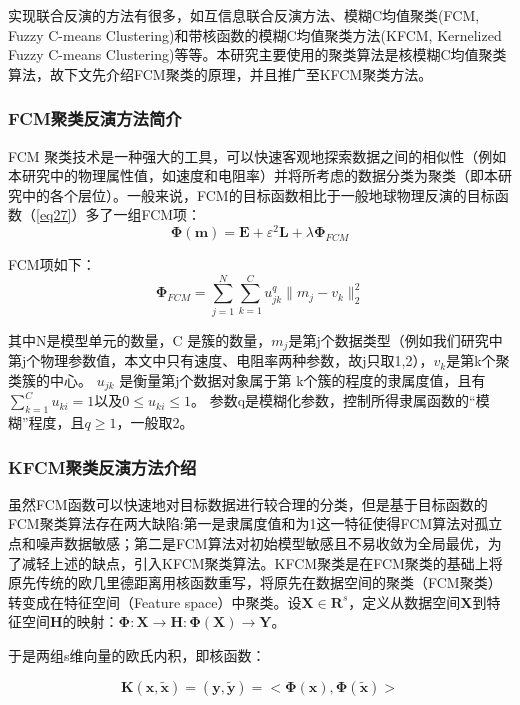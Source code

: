 实现联合反演的方法有很多，如互信息联合反演方法、模糊C均值聚类(FCM, Fuzzy C-means Clustering)和带核函数的模糊C均值聚类方法(KFCM, Kernelized Fuzzy C-means Clustering)等等。本研究主要使用的聚类算法是核模糊C均值聚类算法，故下文先介绍FCM聚类的原理，并且推广至KFCM聚类方法。

\subsubsection{FCM聚类反演方法简介}
FCM 聚类技术是一种强大的工具，可以快速客观地探索数据之间的相似性（例如本研究中的物理属性值，如速度和电阻率）并将所考虑的数据分类为聚类（即本研究中的各个层位）。一般来说，FCM的目标函数相比于一般地球物理反演的目标函数（\ref{eq27}）多了一组FCM项：
\begin{equation}
    \mathbf{\Phi}(\mathbf{m})=\mathbf{E}+\varepsilon^2\mathbf{L}+\lambda\mathbf{\Phi}_{FCM}
    \label{fcmformula}
\end{equation}

FCM项如下：
\begin{equation}
    \mathbf{\Phi}_{FCM}=\sum_{j=1}^{N}\sum_{k=1}^Cu_{jk}^q\|m_j-v_k\|_2^2
    \label{fcmcondition}
\end{equation}

其中N是模型单元的数量，C 是簇的数量，$m_j$是第j个数据类型（例如我们研究中第j个物理参数值，本文中只有速度、电阻率两种参数，故j只取1,2），$v_k$是第k个聚类簇的中心。 $u_{jk}$ 是衡量第j个数据对象属于第 k个簇的程度的隶属度值，且有$\sum_{k=1}^Cu_{ki}=1$以及$0\le u_{ki}\le1$。 参数q是模糊化参数，控制所得隶属函数的“模糊”程度，且$q\ge1$，一般取2。

\subsubsection{KFCM聚类反演方法介绍}

虽然FCM函数可以快速地对目标数据进行较合理的分类，但是基于目标函数的FCM聚类算法存在两大缺陷:第一是隶属度值和为1这一特征使得FCM算法对孤立点和噪声数据敏感；第二是FCM算法对初始模型敏感且不易收敛为全局最优，为了减轻上述的缺点，引入KFCM聚类算法。KFCM聚类是在FCM聚类的基础上将原先传统的欧几里德距离用核函数重写，将原先在数据空间的聚类（FCM聚类）转变成在特征空间（Feature space）中聚类\cite{zhang2004novel}。设$\mathbf{X}\in\mathbf{R}^s$，定义从数据空间$\mathbf{X}$到特征空间$\mathbf{H}$的映射：$\mathbf{\Phi}: \mathbf{X}\to\mathbf{H}:\mathbf{\Phi}(\mathbf{X})\to\mathbf{Y}$。

于是两组s维向量的欧氏内积，即核函数：

\begin{equation}
    \mathbf{K}(\mathbf{x},\mathbf{\widetilde{x}})=(\mathbf{y}, \mathbf{\widetilde{y}}) = <\mathbf{\Phi}(\mathbf{x}), \mathbf{\Phi}(\mathbf{\widetilde{x}})>
\end{equation}

